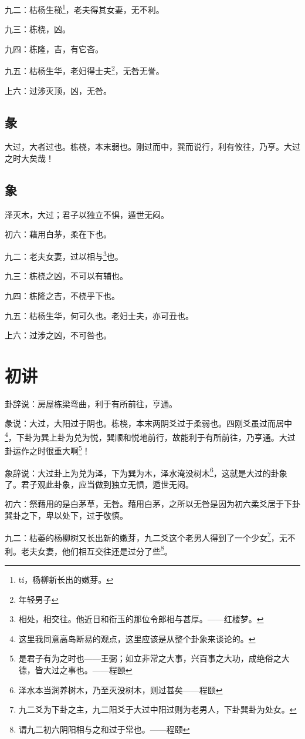 \documentclass[12pt,oneside]{book}
\begin{document}
九二：枯杨生稊\footnote{tí，杨柳新长出的嫩芽。}，老夫得其女妻，无不利。

九三：栋桡，凶。

九四：栋隆，吉，有它吝。

九五：枯杨生华，老妇得士夫\footnote{年轻男子}，无咎无誉。

上六：过涉灭顶，凶，无咎。

\subsection{彖}
大过，大者过也。栋桡，本末弱也。刚过而中，巽而说行，利有攸往，乃亨。大过之时大矣哉！

\subsection{象}
泽灭木，大过；君子以独立不惧，遁世无闷。

初六：藉用白茅，柔在下也。

九二：老夫女妻，过以相与\footnote{相处，相交往。他近日和衔玉的那位令郎相与甚厚。——红楼梦。}也。

九三：栋桡之凶，不可以有辅也。

九四：栋隆之吉，不桡乎下也。

九五：枯杨生华，何可久也。老妇士夫，亦可丑也。

上六：过涉之凶，不可咎也。

\section{初讲}
卦辞说：房屋栋梁弯曲，利于有所前往，亨通。

彖说：大过，大阳过于阴也。栋桡，本末两阴爻过于柔弱也。四刚爻虽过而居中\footnote{这里我同意高岛断易的观点，这里应该是从整个卦象来谈论的。}，下卦为巽上卦为兑为悦，巽顺和悦地前行，故能利于有所前往，乃亨通。大过卦运作之时很重大啊\footnote{是君子有为之时也——王弼；如立非常之大事，兴百事之大功，成绝俗之大德，皆大过之事也。——程颐}！

象辞说：大过卦上为兑为泽，下为巽为木，泽水淹没树木\footnote{泽水本当润养树木，乃至灭没树木，则过甚矣——程颐}，这就是大过的卦象了。君子观此卦象，应当做到独立无惧，遁世无闷。

初六：祭藉用的是白茅草，无咎。藉用白茅，之所以无咎是因为初六柔爻居于下卦巽卦之下，卑以处下，过于敬慎。

九二：枯萎的杨柳树又长出新的嫩芽，九二爻这个老男人得到了一个少女\footnote{九二爻为下卦之主，九二阳爻于大过中阳过则为老男人，下卦巽卦为处女。}，无不利。老夫女妻，他们相互交往还是过分了些\footnote{谓九二初六阴阳相与之和过于常也。——程颐}。
\end{document}
